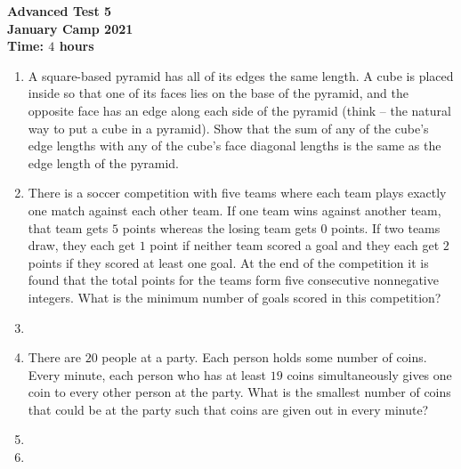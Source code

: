 \documentclass{article}
\begin{document}
\thispagestyle{empty}

\begin{center}
  \textbf{\Large Advanced Test 5}
  \\ \vspace{1em}
  \textbf{\large January Camp 2021}
  \\ \vspace{1em}
  \textbf{\large Time: $4$ hours}
\end{center}

\vspace{12pt}

\begin{enumerate}[1.]

\item %
A square-based pyramid has all of its edges the same length.
A cube is placed inside so that one of its faces lies on the base of the pyramid, and the opposite face has an edge along each side of the pyramid (think -- the natural way to put a cube in a pyramid).
Show that the sum of any of the cube's edge lengths with any of the cube's face diagonal lengths is the same as the edge length of the pyramid.


\item %
There is a soccer competition with five teams where each team plays exactly one match against each other team.
If one team wins against another team, that team gets $5$ points whereas the losing team gets $0$ points.
If two teams draw, they each get $1$ point if neither team scored a goal and they each get $2$ points if they scored at least one goal.
At the end of the competition it is found that the total points for the teams form five consecutive nonnegative integers.
What is the minimum number of goals scored in this competition?


\item %


\item %
There are $20$ people at a party. Each person holds some number of coins. Every minute, each person who has at least $19$ coins simultaneously gives one coin to every other person at the party. What is the smallest number of coins that could be at the party such that coins are given out in every minute? 


\item %


\item %

\end{enumerate}
\end{document}
